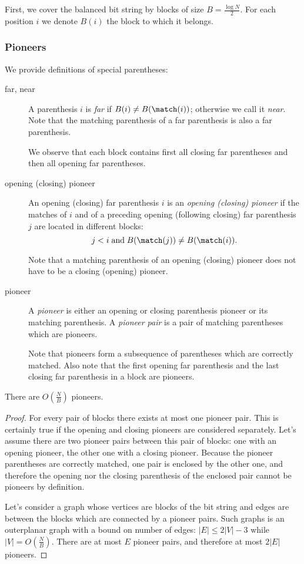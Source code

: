 \bigbreak

First, we cover the balanced bit string by blocks of size $B = \frac{\log N}{2}$.
For each position $i$ we denote $B(i)$ the block to which it belongs.

\subsubsection{Pioneers}

We provide definitions of special parentheses:
\begin{description}
	\item[far, near] 
	A parenthesis $i$ is \emph{far} if $B(i) \ne B(\match(i))$; otherwise we call it \emph{near}.
	Note that the matching parenthesis of a far parenthesis is also a far parenthesis.
	
	We observe that each block contains first all closing far parentheses and then all opening far parentheses.
	
	\item[opening (closing) pioneer]
	An opening (closing) far parenthesis $i$ is an \emph{opening (closing) pioneer} if the matches of $i$ and of a preceding opening (following closing) far parenthesis $j$ are located in different blocks:
	$$ j < i \booland B(\match(j)) \ne B(\match(i)). $$
	
	Note that a matching parenthesis of an opening (closing) pioneer does not have to be a closing (opening) pioneer.
	
	\item[pioneer]
	A \emph{pioneer} is either an opening or closing parenthesis pioneer or its matching parenthesis.
	A \emph{pioneer pair} is a pair of matching parentheses which are pioneers.
	
	Note that pioneers form a subsequence of parentheses which are correctly matched.
	Also note that the first opening far parenthesis and the last closing far parenthesis in a block are pioneers.
\end{description}

\begin{lemma}
	There are $O(\frac{N}{B})$ pioneers.
\end{lemma}
\begin{proof}
	For every pair of blocks there exists at most one pioneer pair.
	This is certainly true if the opening and closing pioneers are considered separately.
	Let's assume there are two pioneer pairs between this pair of blocks: one with an opening pioneer, the other one with a closing pioneer.
	Because the pioneer parentheses are correctly matched, one pair is enclosed by the other one, and therefore the opening nor the closing parenthesis of the enclosed pair cannot be pioneers by definition.
	
	Let's consider a graph whose vertices are blocks of the bit string and edges are between the blocks which are connected by a pioneer pairs.
	Such graphs is an outerplanar graph with a bound on number of edges: $|E| \le 2 |V| - 3$ while $|V| = O(\frac{N}{B})$.
	There are at most $E$ pioneer pairs, and therefore at most $2 |E|$ pioneers.
\end{proof}


